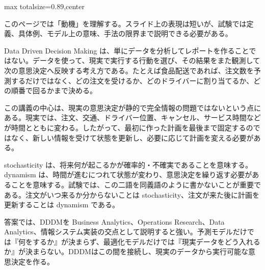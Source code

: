 \begin{minipage}[t]{0.58\textwidth}
\begin{adjustbox}{max totalsize={\textwidth}{0.89\textheight},center}
\begin{minipage}{\textwidth}\scriptsize
{}このページでは「動機」を理解する。スライド上の表現は短いが、試験では定義、具体例、モデル上の意味、手法の限界まで説明できる必要がある。\par
Data Driven Decision Making は、単にデータを分析してレポートを作ることではない。データを使って、現実で実行する行動を選び、その結果をまた観測して次の意思決定へ反映する考え方である。たとえば食品配送であれば、注文数を予測するだけではなく、どの注文を受けるか、どのドライバーに割り当てるか、どの順番で回るかまで決める。\par
この講義の中心は、現実の意思決定が静的で完全情報の問題ではないという点にある。現実では、注文、交通、ドライバー位置、キャンセル、サービス時間などが時間とともに変わる。したがって、最初に作った計画を最後まで固定するのではなく、新しい情報を受けて状態を更新し、必要に応じて計画を変える必要がある。\par
stochasticity は、将来何が起こるかが確率的・不確実であることを意味する。dynamism は、時間が進むにつれて状態が変わり、意思決定を繰り返す必要があることを意味する。試験では、この二語を同義語のように書かないことが重要である。注文がいつ来るか分からないことは stochasticity、注文が来た後に計画を更新することは dynamism である。\par
答案では、DDDMを Business Analytics、Operations Research、Data Analytics、情報システム実装の交点として説明すると強い。予測モデルだけでは『何をするか』が決まらず、最適化モデルだけでは『現実データをどう入れるか』が決まらない。DDDMはこの間を接続し、現実のデータから実行可能な意思決定を作る。\par

\end{minipage}
\end{adjustbox}
\end{minipage}
